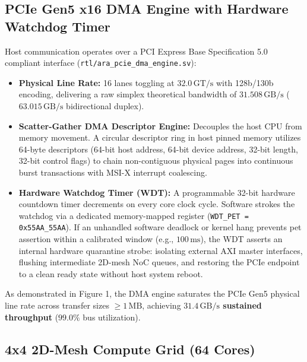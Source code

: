 \documentclass[journal,10pt,twocolumn]{IEEEtran}
\begin{document}
\subsection{PCIe Gen5 x16 DMA Engine with Hardware Watchdog Timer}

Host communication operates over a PCI Express Base Specification 5.0 compliant interface (\texttt{rtl/ara\_pcie\_dma\_engine.sv}):
\begin{itemize}
  \item \textbf{Physical Line Rate:} 16 lanes toggling at $32.0\,\text{GT/s}$ with 128b/130b encoding, delivering a raw simplex theoretical bandwidth of $31.508\,\text{GB/s}$ ($63.015\,\text{GB/s}$ bidirectional duplex).
  \item \textbf{Scatter-Gather DMA Descriptor Engine:} Decouples the host CPU from memory movement. A circular descriptor ring in host pinned memory utilizes 64-byte descriptors ({64-bit host address, 64-bit device address, 32-bit length, 32-bit control flags}) to chain non-contiguous physical pages into continuous burst transactions with MSI-X interrupt coalescing.
  \item \textbf{Hardware Watchdog Timer (WDT):} A programmable 32-bit hardware countdown timer decrements on every core clock cycle. Software strokes the watchdog via a dedicated memory-mapped register (\texttt{WDT\_PET = 0x55AA\_55AA}). If an unhandled software deadlock or kernel hang prevents pet assertion within a calibrated window (e.g., $100\,\text{ms}$), the WDT asserts an internal hardware quarantine strobe: isolating external AXI master interfaces, flushing intermediate 2D-mesh NoC queues, and restoring the PCIe endpoint to a clean ready state without host system reboot.
\end{itemize}

As demonstrated in Figure 1, the DMA engine saturates the PCIe Gen5 physical line rate across transfer sizes $\ge 1\,\text{MB}$, achieving \textbf{$31.4\,\text{GB/s}$ sustained throughput} ($99.0\%$ bus utilization).

\subsection{4x4 2D-Mesh Compute Grid (64 Cores)}
\end{document}
